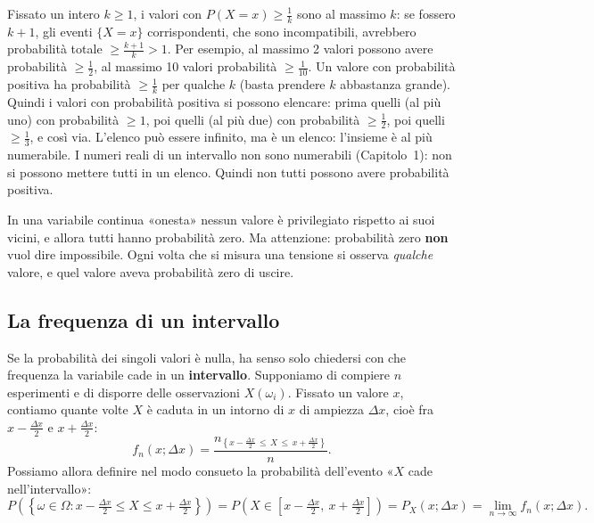 
\begin{dimostrazione}
 Fissato un intero $k \geq 1$, i valori con $P(X = x) \geq \frac1k$ sono al massimo $k$:
se fossero $k + 1$, gli eventi $\{X = x\}$ corrispondenti, che sono incompatibili, avrebbero probabilità totale
$\geq \frac{k+1}{k} > 1$. Per esempio, al massimo 2 valori possono avere probabilità $\geq \frac12$, al massimo 10
valori probabilità $\geq \frac1{10}$.
 Un valore con probabilità positiva ha probabilità $\geq \frac1k$ per qualche $k$ (basta
prendere $k$ abbastanza grande). Quindi i valori con probabilità positiva si possono elencare: prima quelli (al più
uno) con probabilità $\geq 1$, poi quelli (al più due) con probabilità $\geq \frac12$, poi quelli $\geq \frac13$, e così
via. L'elenco può essere infinito, ma è un elenco: l'insieme è al più numerabile.
 I numeri reali di un intervallo non sono numerabili (Capitolo~1): non si possono
mettere tutti in un elenco. Quindi non tutti possono avere probabilità positiva.
\end{dimostrazione}

In una variabile continua «onesta» nessun valore è privilegiato rispetto ai suoi vicini, e allora tutti hanno
probabilità zero. Ma attenzione: probabilità zero \textbf{non} vuol dire impossibile. Ogni volta che si misura una
tensione si osserva \emph{qualche} valore, e quel valore aveva probabilità zero di uscire.

\subsection{La frequenza di un intervallo}

Se la probabilità dei singoli valori è nulla, ha senso solo chiedersi con che frequenza la variabile cade in un
\textbf{intervallo}. Supponiamo di compiere $n$ esperimenti e di disporre delle osservazioni $X(\omega_i)$. Fissato un
valore $x$, contiamo quante volte $X$ è caduta in un intorno di $x$ di ampiezza $\Delta x$, cioè fra
$x - \frac{\Delta x}{2}$ e $x + \frac{\Delta x}{2}$:
\[ f_n(x; \Delta x) = \frac{n_{\left\{x - \frac{\Delta x}{2} \,\leq\, X \,\leq\, x + \frac{\Delta x}{2}\right\}}}{n} . \]
Possiamo allora definire nel modo consueto la probabilità dell'evento «$X$ cade nell'intervallo»:
\[
  P\left( \left\{ \omega \in \Omega : x - \tfrac{\Delta x}{2} \leq X \leq x + \tfrac{\Delta x}{2} \right\} \right)
  = P\left( X \in \left[ x - \tfrac{\Delta x}{2},\ x + \tfrac{\Delta x}{2} \right] \right)
  = P_X(x; \Delta x) = \lim_{n \to \infty} f_n(x; \Delta x) .
\]

